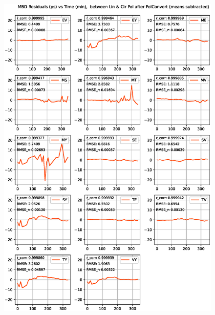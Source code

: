 \documentclass[letterpaper,twoside,12pt]{article}
\begin{document}
\begin{figure}[ht!]
  \begin{center}
  \includegraphics[width=33pc]{MBD_Lin_I_minus_Cir_I.eps}
  \caption{\small }
  \label{mbd_lin_minus_cir}
  \end{center}
\end{figure}
\end{document}
